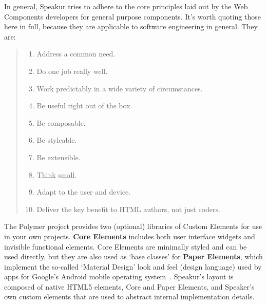 In general, Speakur tries to adhere to the core principles laid out by the 
Web Components developers 
for general purpose components. 
It's worth quoting those here in full, 
because they are applicable to software engineering in general. They are:
\label{sec:wcprinciples}
\begin{quote}
\begin{enumerate}
\item Address a common need.\label{wcp:commonneed}
\item Do one job really well.\label{wcp:onejob}
\item Work predictably in a wide variety of circumstances.\label{wcp:predicatable}
\item Be useful right out of the box.\label{wcp:useful}
\item Be composable.\label{wcp:composable}
\item Be styleable.\label{wcp:stylable}
\item Be extensible.\label{wcp:extensible}
\item Think small.\label{wcp:thinksmall}
\item Adapt to the user and device.\label{wcp:adaptable}
\item Deliver the key benefit to HTML authors, not just coders.\label{wcp:htmlauthors}
~\cite{webcomponentscontributors2014}
\end{enumerate}
\end{quote}


The Polymer project provides two (optional) libraries of Custom Elements for use in your own projects. 
\textbf{Core Elements} includes both user interface
widgets and invisible functional elements.
Core Elements are minimally styled and can be used directly, 
but they are also used as `base classes' for 
\textbf{Paper Elements}, 
which implement the so-called `Material Design' look and feel (design language) used by apps for Google's Android mobile operating system~\cite{imura2015}.
Speakur's layout is composed of native HTML5 elements, 
Core and Paper Elements, 
and Speaker's own custom elements that are used to abstract internal implementation details.

